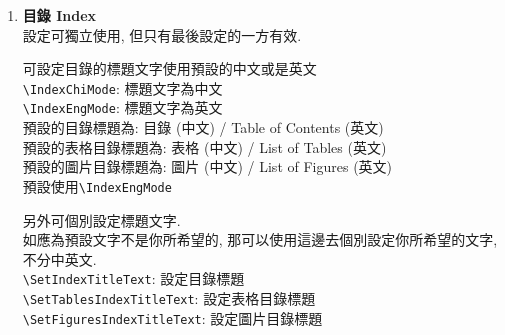 \begin{enumerate}
{    而摘要中的關鍵字, 為了方便同學們能達到以下情況:\\
    a. 只寫中文版摘要\\
    b. 只寫英文版摘要\\
    c. 同時寫中英文版摘要\\
    故中英文版的關鍵字都是可個別設定.\\
    \verb|\SetAbstractChiKeywords|: 用來設定中文版摘要的關鍵字\\
    \verb|\SetAbstractEngKeywords|: 用來設定英文版摘要的關鍵字\\
    \verb|\SetAbstractExtKeywords|: 用來設定英文延伸摘要的關鍵字 (只有你要編寫英文延伸摘要才需要設定)\\
    所以只要使用你需要寫的版本則可. 但如果2個版本都要寫, 則2個都同時使用則可. 沒有填寫的話, 則摘要中的關鍵字部份是不會顯示出來.

    e.g\\
    \verb|\SetAbstractChiKeywords{關鍵字 A}{關鍵字 B}{關鍵字 C}|\\
    \verb|\SetAbstractEngKeywords{Keyword A}{Keyword B}{Keyword C}|\\
    \verb|\SetAbstractExtKeywords{Keyword A}{Keyword B}{Keyword C}|\\
    英文延伸摘要的關鍵字理應會跟英文版摘要的關鍵字是一樣, 但為了同學能編寫不同內容和關鍵字, 故可獨立設定.
  } %

  \item
  {
    \textbf{目錄 Index}\\
    設定可獨立使用, 但只有最後設定的一方有效.

    可設定目錄的標題文字使用預設的中文或是英文\\
    \verb|\IndexChiMode|:  標題文字為中文\\
    \verb|\IndexEngMode|:  標題文字為英文\\
    預設的目錄標題為: 目錄 (中文) / Table of Contents (英文)\\
    預設的表格目錄標題為: 表格 (中文) / List of Tables (英文)\\
    預設的圖片目錄標題為: 圖片 (中文) / List of Figures (英文)\\
    預設使用\verb|\IndexEngMode|

    另外可個別設定標題文字.\\
    如應為預設文字不是你所希望的, 那可以使用這邊去個別設定你所希望的文字, 不分中英文.\\
    \verb|\SetIndexTitleText|: 設定目錄標題\\
    \verb|\SetTablesIndexTitleText|: 設定表格目錄標題\\
    \verb|\SetFiguresIndexTitleText|: 設定圖片目錄標題
  } %


\end{enumerate}
